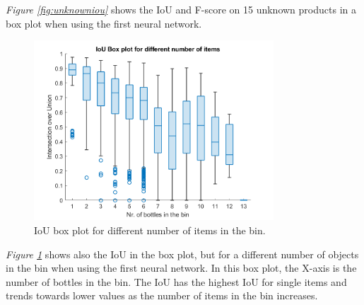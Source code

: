 \textit{Figure \ref{fig:unknowniou}} shows the IoU and F-score on 15 unknown products in a box plot  when using the first neural network.
\begin{figure}[h]
    \centering
    \includegraphics[width=0.8\textwidth]{graphics/results/boxplotBottles.png}
    \caption{IoU box plot for different number of items in the bin.}
    \label{fig:bottles}
\end{figure}

\textit{Figure \ref{fig:bottles}} shows also the IoU in the box plot, but for a different number of objects in the bin when using the first neural network. In this box plot, the X-axis is the number of bottles in the bin. The IoU has the highest IoU for single items and trends towards lower values as the number of items in the bin increases.

